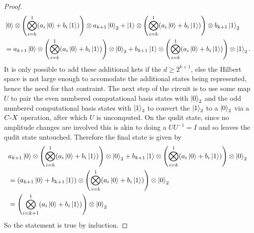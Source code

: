 \begin{proof}
    \begin{align}
        &\ket{0} \otimes \left(\bigotimes_{i = k}^{1}(a_i\ket{0} + b_i\ket{1})\right)\otimes a_{k+1}\ket{0}_2
        +
        \ket{1} \otimes \left(\bigotimes_{i = k}^{1}(a_i\ket{0} + b_i\ket{1})\right)\otimes b_{k+1}\ket{1}_2\\
        &= a_{k+1}\ket{0} \otimes \left(\bigotimes_{i = k}^{1}(a_i\ket{0} + b_i\ket{1})\right)\otimes \ket{0}_2
        +
        b_{k+1} \ket{1} \otimes \left(\bigotimes_{i = k}^{1}(a_i\ket{0} + b_i\ket{1})\right)\otimes \ket{1}_2.
    \end{align}
    It is only possible to add these additional kets if the $d \geq 2^{k+1}$, else the Hilbert space is not large enough to accomodate the additional states being represented, hence the need for that contraint.
    The next step of the circuit is to use some map $U$ to pair the even numbered computational basis states with $\ket{0}_2$ and the odd numbered computational basis states with $\ket{1}_2$ to convert the $\ket{1}_2$ to a $\ket{0}_2$ via a $C\text{-}X$ operation, after which $U$ is uncomputed.
    On the qudit state, since no amplitude changes are involved this is akin to doing a $UU^{-1}=I$ and so leaves the qudit state untouched.
    Therefore the final state is given by
    \begin{align}
        &a_{k+1}\ket{0} \otimes \left(\bigotimes_{i = k}^{1}(a_i\ket{0} + b_i\ket{1})\right)\otimes \ket{0}_2
        +
        b_{k+1} \ket{1} \otimes \left(\bigotimes_{i = k}^{1}(a_i\ket{0} + b_i\ket{1})\right)\otimes \ket{0}_2\\
        &=\left(a_{k+1}\ket{0}+b_{k+1} \ket{1}\right) \otimes \left(\bigotimes_{i = k}^{1}(a_i\ket{0} + b_i\ket{1})\right)\otimes \ket{0}_2\\
        &=\left(\bigotimes_{i = k+1}^{1}(a_i\ket{0} + b_i\ket{1})\right)\otimes \ket{0}_2
    \end{align}
    So the statement is true by induction.
\end{proof}